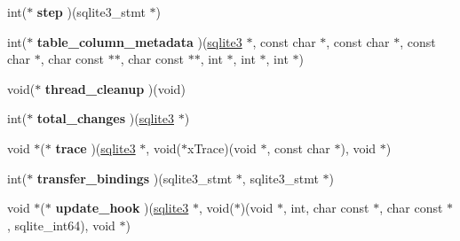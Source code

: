 \begin{DoxyCompactItemize}
\item 
int($\ast$ {\bfseries step} )(sqlite3\+\_\+stmt $\ast$)\hypertarget{structsqlite3__api__routines_a40f899787bbfd866efa43f5337addbdc}{}\label{structsqlite3__api__routines_a40f899787bbfd866efa43f5337addbdc}

\item 
int($\ast$ {\bfseries table\+\_\+column\+\_\+metadata} )(\hyperlink{structsqlite3}{sqlite3} $\ast$, const char $\ast$, const char $\ast$, const char $\ast$, char const $\ast$$\ast$, char const $\ast$$\ast$, int $\ast$, int $\ast$, int $\ast$)\hypertarget{structsqlite3__api__routines_a8fdf517f6c889edf0e0206fd8846eba5}{}\label{structsqlite3__api__routines_a8fdf517f6c889edf0e0206fd8846eba5}

\item 
void($\ast$ {\bfseries thread\+\_\+cleanup} )(void)\hypertarget{structsqlite3__api__routines_aafef606568e3b1706477c795e343da66}{}\label{structsqlite3__api__routines_aafef606568e3b1706477c795e343da66}

\item 
int($\ast$ {\bfseries total\+\_\+changes} )(\hyperlink{structsqlite3}{sqlite3} $\ast$)\hypertarget{structsqlite3__api__routines_a5bf72c6b416c8a29ed60940947ce5737}{}\label{structsqlite3__api__routines_a5bf72c6b416c8a29ed60940947ce5737}

\item 
void $\ast$($\ast$ {\bfseries trace} )(\hyperlink{structsqlite3}{sqlite3} $\ast$, void($\ast$x\+Trace)(void $\ast$, const char $\ast$), void $\ast$)\hypertarget{structsqlite3__api__routines_a66cca536b125f02ca60dc5dd156bf44a}{}\label{structsqlite3__api__routines_a66cca536b125f02ca60dc5dd156bf44a}

\item 
int($\ast$ {\bfseries transfer\+\_\+bindings} )(sqlite3\+\_\+stmt $\ast$, sqlite3\+\_\+stmt $\ast$)\hypertarget{structsqlite3__api__routines_a76b183a79f69910802d39aa9898cef4e}{}\label{structsqlite3__api__routines_a76b183a79f69910802d39aa9898cef4e}

\item 
void $\ast$($\ast$ {\bfseries update\+\_\+hook} )(\hyperlink{structsqlite3}{sqlite3} $\ast$, void($\ast$)(void $\ast$, int, char const $\ast$, char const $\ast$,                                                                                                                                                           sqlite\+\_\+int64), void $\ast$)\hypertarget{structsqlite3__api__routines_aef4d86bc72fa0ea84d6e9189a9da3f3a}{}\label{structsqlite3__api__routines_aef4d86bc72fa0ea84d6e9189a9da3f3a}


\end{DoxyCompactItemize}
